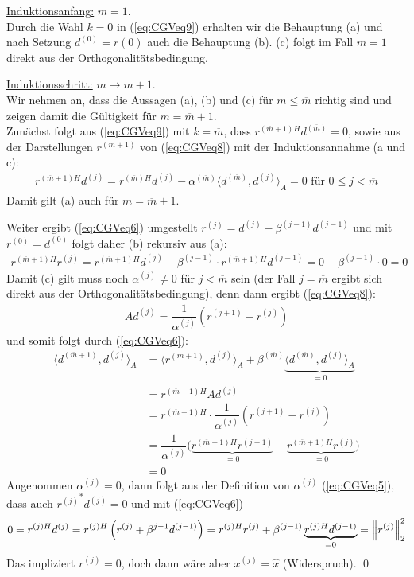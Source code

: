 \underline{Induktionsanfang:} $m=1$. \\
Durch die Wahl $k=0$ in (\ref{eq:CGVeq9}) erhalten wir die Behauptung (a) 
und nach Setzung $d^{(0)}=r{(0)}$ auch die Behauptung (b). (c) folgt im Fall $m=1$ direkt aus der 
Orthogonalitätsbedingung. 

\underline{Induktionsschritt:} $m\rightarrow m+1$. \\
Wir nehmen an, dass die Aussagen (a), (b) und (c) 
für $m\leq\overline{m}$ richtig sind und zeigen damit die Gültigkeit für $m=\overline{m}+1$. \\
Zunächst folgt aus (\ref{eq:CGVeq9}) mit $k=\overline{m}$, dass ${r^{(\overline{m}+1)H}}d^{(\overline{m})} = 0$, 
sowie aus der Darstellungen $r^{(m+1)}$ von (\ref{eq:CGVeq8}) mit der Induktionsannahme (a und c):
%
\begin{align*}
  {r^{(\overline{m}+1)H}}d^{(j)} 
  = {r^{(\overline{m})H}}d^{(j)} - \alpha^{(\overline{m})}\langle d^{(\overline{m})}, d^{(j)} \rangle_A 
  = 0 
  \text{ für } 0\leq j < \overline{m}
\end{align*}
%
Damit gilt (a) auch für $m=\overline{m}+1$. 

Weiter ergibt (\ref{eq:CGVeq6}) umgestellt $r^{(j)} = d^{(j)} - \beta^{(j-1)}d^{(j-1)}$ und mit $r^{(0)}=d^{(0)}$ folgt 
daher (b) rekursiv aus (a):
%
\begin{align*}
  {r^{(\overline{m}+1)H}}r^{(j)} 
  = {r^{(\overline{m}+1)H}}d^{(j)} - \beta^{(j-1)}\cdot {r^{(\overline{m}+1)H}}d^{(j-1)} 
  = 0 - \beta^{(j-1)}\cdot 0 
  = 0
\end{align*}
%
Damit (c) gilt muss noch $\alpha^{(j)}\neq 0$ für $j<\overline{m}$ sein (der Fall $j=\overline{m}$ ergibt sich direkt aus 
der Orthogonalitätsbedingung), denn dann ergibt (\ref{eq:CGVeq8}):
%
\begin{align*}
  Ad^{(j)} = \dfrac{1}{\alpha^{(j)}} \left(r^{(j+1)}- r^{(j)}\right)
\end{align*}
%
und somit folgt durch (\ref{eq:CGVeq6}):
%
\begin{align*}
  \langle d^{(\overline{m}+1)}, d^{(j)}\rangle_A 
  &= \langle r^{(\overline{m}+1)}, d^{(j)}\rangle_A 
  + \beta^{(\overline{m})}\underbrace{\langle d^{(\overline{m})}, d^{(j)}\rangle_A}_{=0}\\
  &= {r^{(\overline{m}+1)H}}Ad^{(j)} \\
  &= r^{(\overline{m}+1)H}\cdot\dfrac{1}{\alpha^{(j)}} \left(r^{(j+1)}- r^{(j)}\right) \\
  &= \dfrac{1}{\alpha^{(j)}} 
  \Big(\underbrace{r^{(\overline{m}+1)H}r^{(j+1)}}_{=0} - \underbrace{r^{(\overline{m}+1)H}r^{(j)}}_{=0}\Big) \\
  &= 0 
\end{align*}
%
Angenommen $\alpha^{(j)} = 0$, dann folgt aus der Definition von $\alpha^{(j)}$ (\ref{eq:CGVeq5}), 
dass auch ${r^{(j)}}^*d^{(j)}=0$ und mit (\ref{eq:CGVeq6}) 
%
\begin{align*}
  0 = {r^{(j)H}}d^{(j)}
  = {r^{(j)H}}\left(r^{(j)}+\beta^{j-1}d^{(j-1)}\right) 
  = {r^{(j)H}}r^{(j)}+\beta^{(j-1)}\underbrace{{r^{(j)H}}d^{(j-1)}}_{=0} 
  = \vertn{2}{r^{(j)}}_2^2
\end{align*}
Das impliziert $r^{(j)} = 0$, doch dann wäre aber $x^{(j)}=\hat{x}$ (Widerspruch). \qed 

